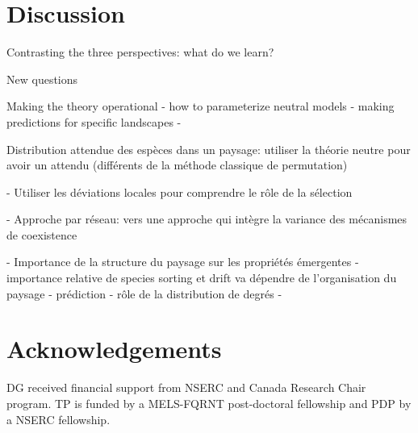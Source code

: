 \documentclass[12pt]{article}
\begin{document}
\section{Discussion}

Contrasting the three perspectives: what do we learn?

New questions

Making the theory operational
	- how to parameterize neutral models
	- making predictions for specific landscapes
	- 


Distribution attendue des espèces dans un paysage: utiliser la théorie neutre pour avoir un attendu (différents de la méthode classique de permutation)

- Utiliser les déviations locales pour comprendre le rôle de la sélection 

- Approche par réseau: vers une approche qui intègre la variance des mécanismes de coexistence

- Importance de la structure du paysage sur les propriétés émergentes
	- importance relative de species sorting et drift va dépendre de l'organisation du paysage
	- prédiction
	- rôle de la distribution de degrés
- 

\section{Acknowledgements}
DG received financial support from NSERC and Canada Research Chair program. TP is funded by a MELS-FQRNT post-doctoral fellowship and PDP by a NSERC fellowship.
\newpage

\printbibliography
\newpage
\end{document}
